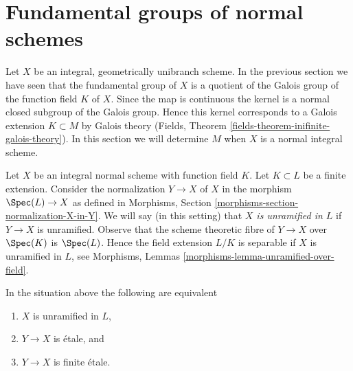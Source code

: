 \section{Fundamental groups of normal schemes}
\label{section-normal}

\noindent
Let $X$ be an integral, geometrically unibranch scheme. In the previous section
we have seen that the fundamental group of $X$ is a quotient of the
Galois group of the function field $K$ of $X$. Since the map is continuous
the kernel is a normal closed subgroup of the Galois group. Hence this kernel
corresponds to a Galois extension $K \subset M$ by Galois theory
(Fields, Theorem \ref{fields-theorem-inifinite-galois-theory}).
In this section we will determine $M$ when $X$ is a normal integral scheme.

\medskip\noindent
Let $X$ be an integral normal scheme with function field $K$.
Let $K \subset L$ be a finite extension. Consider the normalization
$Y \to X$ of $X$ in the morphism $\Spec(L) \to X$ as defined in
Morphisms, Section \ref{morphisms-section-normalization-X-in-Y}.
We will say (in this setting) that {\it $X$ is unramified in $L$}
if $Y \to X$ is unramified. Observe that the
scheme theoretic fibre of $Y \to X$ over $\Spec(K)$ is $\Spec(L)$.
Hence the field extension $L/K$ is separable if $X$ is
unramified in $L$, see
Morphisms, Lemmas \ref{morphisms-lemma-unramified-over-field}.

\begin{lemma}
\label{lemma-unramified-in-L}
In the situation above the following are equivalent
\begin{enumerate}
\item $X$ is unramified in $L$,
\item $Y \to X$ is \'etale, and
\item $Y \to X$ is finite \'etale.
\end{enumerate}
\end{lemma}

